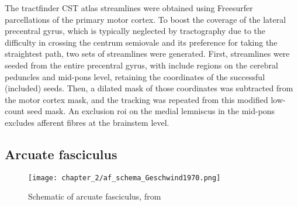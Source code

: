The tractfinder CST atlas streamlines were obtained using Freesurfer parcellations \autocite{Desikan2006,FischlSalat2002} of the primary motor cortex.
To boost the coverage of the lateral precentral gyrus,\autocite{Ebeling1992} which is typically neglected by tractography due to the difficulty in crossing the centrum semiovale and its preference for taking the straightest path, two sets of streamlines were generated.
First, streamlines were seeded from the entire precentral gyrus, with include regions on the cerebral peduncles and mid-pons level, retaining the coordinates of the successful (included) seeds.
Then, a dilated mask of those coordinates was subtracted from the motor cortex mask, and the tracking was repeated from this modified low-count seed mask.
An exclusion \gls{roi} on the medial lemniscus in the mid-pons excludes afferent fibres at the brainstem level.

\subsection{Arcuate fasciculus}

%

\begin{SCfigure}[][htb!]
  \texttt{[image: chapter\_2/af\_schema\_Geschwind1970.png]}
  \caption{ Schematic of arcuate fasciculus, from \textcite{Geschwind1970}}
  \label{fig:af}
\end{SCfigure}


